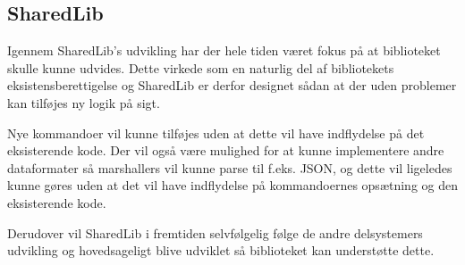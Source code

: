 \subsection{SharedLib}
Igennem SharedLib's udvikling har der hele tiden været fokus på at biblioteket skulle kunne udvides. Dette virkede som en naturlig del af bibliotekets eksistensberettigelse og SharedLib er derfor designet sådan at der uden problemer kan tilføjes ny logik på sigt. 

Nye kommandoer vil kunne tilføjes uden at dette vil have indflydelse på det eksisterende kode. Der vil også være mulighed for at kunne implementere andre dataformater så marshallers vil kunne parse til f.eks. JSON, og dette vil ligeledes kunne gøres uden at det vil have indflydelse på kommandoernes opsætning og den eksisterende kode.

Derudover vil SharedLib i fremtiden selvfølgelig følge de andre delsystemers udvikling og hovedsageligt blive udviklet så biblioteket kan understøtte dette.